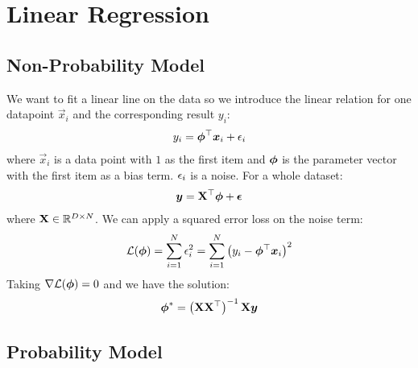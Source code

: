 
\chapter{Linear Regression}
\label{chapter6}

\section{Non-Probability Model}
\label{section6.1}

We want to fit a linear line on the data so we introduce the linear relation for one datapoint $\vec{x}_i$ and the corresponding result $y_i$:
\begin{align*}
	y_i=\boldsymbol{\phi}{}^\top\boldsymbol{x}_i+\epsilon_i
\end{align*}
where $\vec{x}_i$ is a data point with $1$ as the first item and $\boldsymbol{\phi}$ is the parameter vector with the first item as a bias term. $\epsilon_i$ is a noise. For a whole dataset:
\begin{align*}
	\boldsymbol{y}=\mathbf{X}{}^\top\boldsymbol{\phi}+\boldsymbol{\epsilon}
\end{align*}
where $\mathbf{X}\in\mathbb{R}^{D\times N}$. We can apply a squared error loss on the noise term:
\begin{align*}
	\mathcal{L}(\boldsymbol{\phi})=\sum_{i=1}^N\epsilon_i^2=\sum_{i=1}^N\left(y_i-\boldsymbol{\phi}{}^\top\boldsymbol{x}_i\right)^2
\end{align*}
Taking $\nabla\mathcal{L}(\boldsymbol{\phi})=0$ and we have the solution:
\begin{align*}
	\boldsymbol{\phi}^*=\left(\mathbf{X}\mathbf{X}{}^\top\right)^{-1}\mathbf{X}\boldsymbol{y}
\end{align*}



\section{Probability Model}
\label{section6.2}

